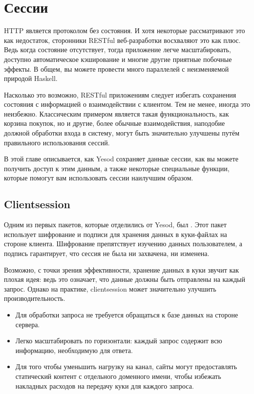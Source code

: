\chapter{Сессии}\label{chap:sessions}

HTTP является протоколом без состояния. И хотя некоторые рассматривают это как недостаток, сторонники RESTful веб-разработки восхваляют это как плюс. Ведь когда состояние отсутствует, тогда приложение легче масштабировать, доступно автоматическое кэширование и многие другие приятные побочные эффекты. В общем, вы можете провести много параллелей с неизменяемой природой Haskell.

Насколько это возможно, RESTful приложениям следует избегать сохранения состояния с информацией о взаимодействии с клиентом. Тем не менее, иногда это неизбежно. Классическим примером является такая функциональность, как корзина покупок, но и другие, более обычные взаимодействия, наподобие должной обработки входа в систему, могут быть значительно улучшены путём правильного использования сессий.

В этой главе описывается, как Yesod сохраняет данные сессии, как вы можете получить доступ к этим данным, а также некоторые специальные функции, которые помогут вам использовать сессии наилучшим образом.

\section{Clientsession}

Одним из первых пакетов, которые отделились от Yesod, был . Этот пакет использует шифрование и подписи для хранения данных в куки-файлах на стороне клиента. Шифрование препятствует изучению данных пользователем, а подпись гарантирует, что сессия не была ни захвачена, ни изменена.

Возможно, с точки зрения эффективности, хранение данных в куки звучит как плохая идея: ведь это означает, что данные должны быть отправлены на каждый запрос. Однако на практике, clientsession может значительно улучшить производительность.

\begin{itemize}
  \item Для обработки запроса не требуется обращаться к базе данных на стороне сервера.
  \item Легко масштабировать по горизонтали: каждый запрос содержит всю информацию, необходимую для ответа.
  \item Для того чтобы уменьшить нагрузку на канал, сайты могут предоставлять статический контент с отдельного доменного имени, чтобы избежать накладных расходов на передачу куки для каждого запроса.
\end{itemize}

